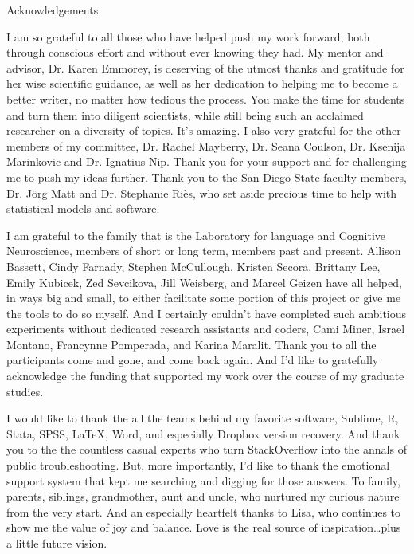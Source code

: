         \newpage
        \listoffigures
        \newpage
        \listoftables
        \newpage
        \RaggedRight \raggedbottom
        \doublespacing
        \centerline{Acknowledgements}  
            \thispagestyle{plain} 
            I am so grateful to all those who have helped push my work forward, both through conscious effort and without ever knowing they had. My mentor and advisor, Dr. Karen Emmorey, is deserving of the utmost thanks and gratitude for her wise scientific guidance, as well as her dedication to helping me to become a better writer, no matter how tedious the process. You make the time for students and turn them into diligent scientists, while still being such an acclaimed researcher on a diversity of topics. It's amazing. 
            I also very grateful for the other members of my committee, Dr. Rachel Mayberry, Dr. Seana Coulson, Dr. Ksenija Marinkovic and Dr. Ignatius Nip. Thank you for your support and for challenging me to push my ideas further. Thank you to the San Diego State faculty members, Dr. J{\"o}rg Matt and Dr. Stephanie Ri{\`e}s, who set aside precious time to help with statistical models and software.\par
            I am grateful to the family that is the Laboratory for language and Cognitive Neuroscience, members of short or long term, members past and present. Allison Bassett, Cindy Farnady, Stephen McCullough, Kristen Secora, Brittany Lee, Emily Kubicek, Zed Sevcikova, Jill Weisberg, and Marcel Geizen have all helped, in ways big and small, to either facilitate some portion of this project or give me the tools to do so myself. And I certainly couldn't have completed such ambitious experiments without dedicated research assistants and coders, Cami Miner, Israel Montano, Francynne Pomperada, and Karina Maralit. Thank you to all the participants come and gone, and come back again. And I'd like to gratefully acknowledge the funding that supported my work over the course of my graduate studies. \par
            I would like to thank the all the teams behind my favorite software, Sublime, R, Stata, SPSS, \LaTeX, Word, and especially Dropbox version recovery. And thank you to the the countless casual experts who turn StackOverflow into the annals of public troubleshooting.
            But, more importantly, I'd like to thank the emotional support system that kept me searching and digging for those answers. To family, parents, siblings, grandmother, aunt and uncle, who nurtured my curious nature from the very start. And an especially heartfelt thanks to Lisa, who continues to show me the value of joy and balance. Love is the real source of inspiration\ldots plus a little future vision. \par
